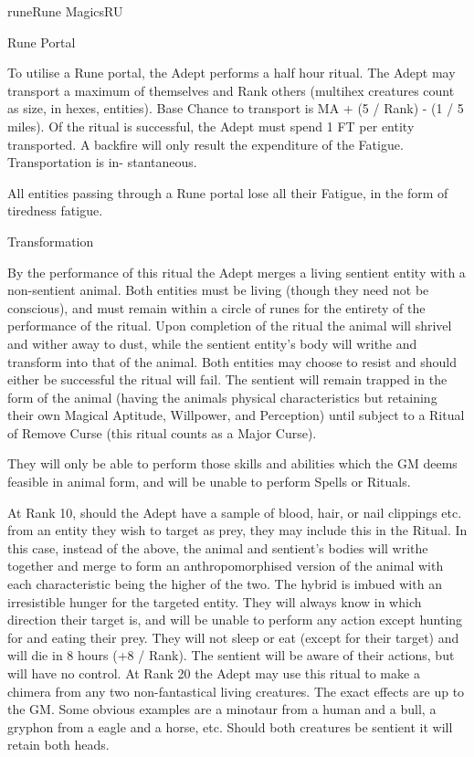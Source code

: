 \begin{College}[2.2]{rune}{Rune Magics}{RU}
\begin{ritual}[R-6]{Rune Portal}
\begin{effects}
To utilise a Rune portal, the Adept performs a half hour ritual.  The
Adept may transport a maximum of themselves and Rank others (multihex
creatures count as size, in hexes, entities).  Base Chance to
transport is MA + (5 / Rank) - (1 / 5 miles). Of the ritual is
successful, the Adept must spend 1 FT per entity transported.  A
backfire will only result the expenditure of the Fatigue.
Transportation is in- stantaneous.

All entities passing through a Rune portal lose all their Fatigue, in
the form of tiredness fatigue.
\end{effects}
\end{ritual}

\begin{ritual}[R-7]{Transformation}

\begin{effects}
By the performance of this ritual the Adept merges a living sentient
entity with a non-sentient animal.  Both entities must be living
(though they need not be conscious), and must remain within a circle
of runes for the entirety of the performance of the ritual.  Upon
completion of the ritual the animal will shrivel and wither away to
dust, while the sentient entity’s body will writhe and transform into
that of the animal. Both entities may choose to resist and should
either be successful the ritual will fail. The sentient will remain
trapped in the form of the animal (having the animals physical
characteristics but retaining their own Magical Aptitude, Willpower,
and Perception) until subject to a Ritual of Remove Curse (this ritual
counts as a Major Curse).

They will only be able to perform those skills and abilities which the
GM deems feasible in animal form, and will be unable to perform Spells
or Rituals.

At Rank 10, should the Adept have a sample of blood, hair, or nail
clippings etc.  from an entity they wish to target as prey, they may
include this in the Ritual.  In this case, instead of the above, the
animal and sentient’s bodies will writhe together and merge to form an
anthropomorphised version of the animal with each characteristic being
the higher of the two.  The hybrid is imbued with an irresistible
hunger for the targeted entity.  They will always know in which
direction their target is, and will be unable to perform any action
except hunting for and eating their prey. They will not sleep or eat
(except for their target) and will die in 8 hours (+8 / Rank).  The
sentient will be aware of their actions, but will have no control.  At
Rank 20 the Adept may use this ritual to make a chimera from any two
non-fantastical living creatures. The exact effects are up to the GM.
Some obvious examples are a minotaur from a human and a bull, a
gryphon from a eagle and a horse, etc.  Should both creatures be
sentient it will retain both heads.
\end{effects}
\end{ritual}

\end{College}
